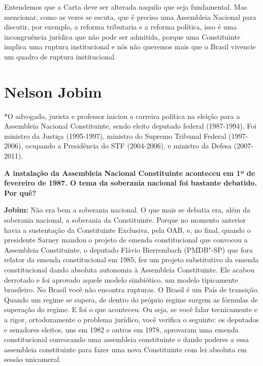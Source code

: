 Entendemos que a Carta deve ser alterada naquilo que seja fundamental.
Mas mencionar, como as vezes se escuta, que é preciso uma Assembleia
Nacional para discutir, por exemplo, a reforma tributaria e a reforma
política, isso é uma incongruência jurídica que não pode ser admitida,
porque uma Constituinte implica uma ruptura institucional e nós não
queremos mais que o Brasil vivencie um quadro de ruptura institucional.

\section{Nelson Jobim}

*O advogado, jurista e professor iniciou a carreira política na eleição
para a Assembleia Nacional Constituinte, sendo eleito deputado federal
(1987-1994). Foi ministro da Justiça (1995-1997), ministro do Supremo
Tribunal Federal (1997-2006), ocupando a Presidência do STF (2004-2006),
e ministro da Defesa (2007-2011).

\textbf{A instalação da Assembleia Nacional Constituinte aconteceu em 1º
de fevereiro de 1987. O tema da soberania nacional foi bastante
debatido. Por quê?}

\textbf{Jobim:} Não era bem a soberania nacional. O que mais se debatia
era, além da soberania nacional, a soberania da Constituinte. Porque no
momento anterior havia a sustentação da Constituinte Exclusiva, pela
OAB, e, no final, quando o presidente Sarney mandou o projeto de emenda
constitucional que convocou a Assembleia Constituinte, o deputado Flávio
Bierrembach (PMDB"-SP) que fora relator da emenda constitucional em 1985,
fez um projeto substitutivo da emenda constitucional dando absoluta
autonomia à Assembleia Constituinte. Ele acabou derrotado e foi aprovado
aquele modelo simbiótico, um modelo tipicamente brasileiro. No Brasil
você não encontra rupturas. O Brasil é um País de transição. Quando um
regime se supera, de dentro do próprio regime surgem as fórmulas de
superação do regime. E foi o que aconteceu. Ou seja, se você falar
tecnicamente e a rigor, ortodoxamente o problema jurídico, você verifica
o seguinte: os deputados e senadores eleitos, uns em 1982 e outros em
1978, aprovaram uma emenda constitucional convocando uma assembleia
constituinte e dando poderes a essa assembleia constituinte para fazer
uma nova Constituinte com lei absoluta em sessão unicameral.

